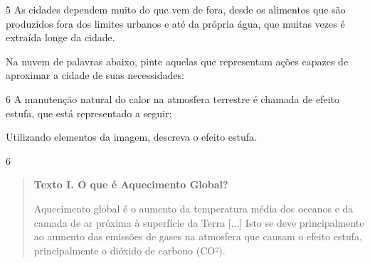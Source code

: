 \num{5} As cidades dependem muito do que vem de fora, desde os alimentos que
são produzidos fora dos limites urbanos e até da própria água, que
muitas vezes é extraída longe da cidade.

Na nuvem de palavras abaixo, pinte aquelas que representam ações capazes
de aproximar a cidade de suas necessidades:

\begin{multicols}{2}


\end{multicols}


\num{6} A manutenção natural do calor na atmosfera terrestre é chamada de
efeito estufa, que está representado a seguir:



Utilizando elementos da imagem, descreva o efeito estufa.



\num{6}

\begin{quote}
\textbf{Texto I. O que é Aquecimento Global?}

Aquecimento global é o aumento da temperatura média dos oceanos e
da camada de ar próxima à superfície da Terra {[}...{]} Isto se deve
principalmente ao aumento das emissões de gases na atmosfera que causam
o efeito estufa, principalmente o dióxido de carbono
(CO²).

\end{quote}

